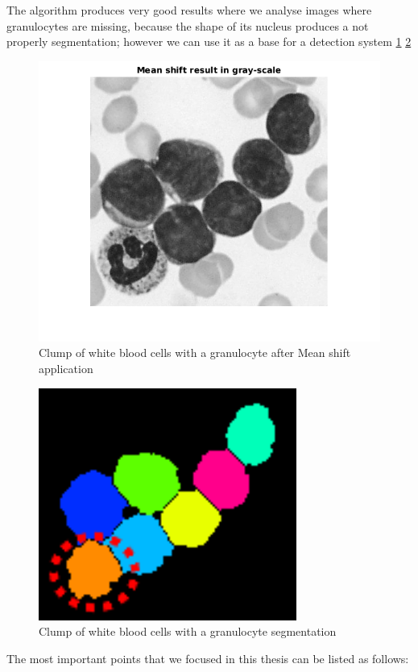 The algorithm produces very good results where we analyse images where granulocytes are missing, because the shape of its nucleus produces a not properly segmentation; however we can use it as a base for a detection system \ref{fig:grangray} \ref{fig:gran}
\begin{figure}
\begin{center}
		\includegraphics[scale=0.5]{img/final/meangran.png}
		\caption{Clump of white blood cells with a  granulocyte after Mean shift application}
		\label{fig:grangray}
\end{center}
\end{figure}
\begin{figure}
\begin{center}
		\includegraphics[scale=0.5]{img/final/fingran1.png}
		\caption{Clump of white blood cells with a granulocyte segmentation}
		\label{fig:gran}
\end{center}
\end{figure}
The most important points that we focused in this thesis can be listed as follows:
\bigskip

